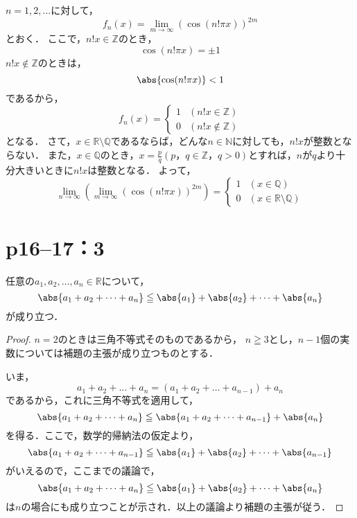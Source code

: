 $n=1,2,\ldots$に対して，
\[
    f_{n} (x)=\lim_{m \to \infty} (\cos (n! \pi x)) ^{2m}
\]
とおく．
ここで，$n!x \in \mathbb{Z}$のとき，
\[
    \cos (n! \pi x)=\pm 1
\]
$n!x \notin \mathbb{Z}$のときは，
\[
    \abs{\cos (n! \pi x)}<1
\]
であるから，
\[
    f_{n} (x)=
    \begin{cases}
        1 & (n!x \in \mathbb{Z})    \\
        0 & (n!x \notin \mathbb{Z})
    \end{cases}
\]
となる．
さて，$x \in \mathbb{R} \setminus \mathbb{Q}$であるならば，どんな$n \in \mathbb{N}$に対しても，$n! x$が整数とならない．
また，$x \in \mathbb{Q}$のとき，$ x=\frac{p}{q}(p，q \in \mathbb{Z}，q>0)$とすれば，$n$が$q$より十分大きいときに$n!x$は整数となる．
よって，
\[
    \lim_{n \to \infty} \left( \lim_{m \to \infty} (\cos (n! \pi x)) ^{2m} \right)=
    \begin{cases}
        1 & (x \in \mathbb{Q})                      \\
        0 & (x \in \mathbb{R} \setminus \mathbb{Q})
    \end{cases}
\]


\section*{p16--17：3}


任意の$a_1 , a_2 , \dots, a_n \in \mathbb{R}$について，
\[
    \abs{a_1+a_2+\dots+a_n} \leqq \abs{a_1}+\abs{a_2}+\dots+\abs{a_n}
\]
が成り立つ．


\begin{proof}
    $n=2$のときは三角不等式そのものであるから，
    $n \geqq 3$とし，$n-1$個の実数については補題の主張が成り立つものとする．

    いま，
    \[
        a_1 + a_2 + \dots + a_n = (a_1+a_2+\dots+a_{n-1})+a_n
    \]
    であるから，これに三角不等式を適用して，
    \[
        \abs{a_1+a_2+\dots+a_n} \leqq \abs{a_1+a_2+\dots+a_{n-1}} +\abs{a_n}
    \]
    を得る．ここで，数学的帰納法の仮定より，
    \[
        \abs{a_1+a_2+\dots+a_{n-1}} \leqq \abs{a_1}+\abs{a_2}+\dots+\abs{a_{n-1}}
    \]
    がいえるので，ここまでの議論で，
    \[
        \abs{a_1+a_2+\dots+a_n} \leqq \abs{a_1}+\abs{a_2}+\dots+\abs{a_n}
    \]
    は$n$の場合にも成り立つことが示され．以上の議論より補題の主張が従う．
\end{proof}

